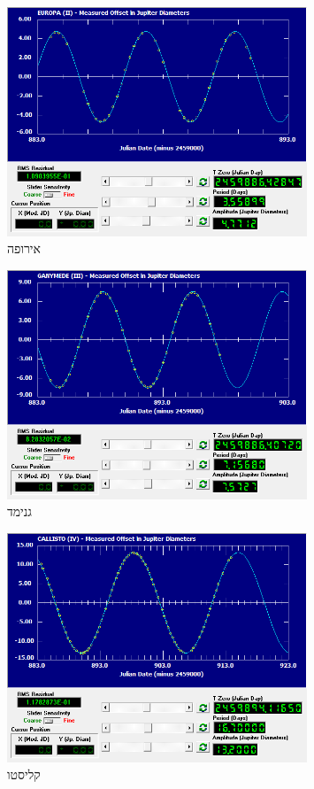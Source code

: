 \documentclass[a4paper, 12pt]{article}
\begin{document}
    \vfill

    \begin{figure}[h!]
        \centering
        \includegraphics[width=0.8\textwidth]{../assets/europa_graph.png}
        \caption{אירופה}
    \end{figure}

    \vfill

    \pagebreak %

    \begin{figure}[h!]
        \centering
        \includegraphics[width=0.8\textwidth]{../assets/ganymede_graph.png}
        \caption{גנימד}
    \end{figure}

    \vfill

    \begin{figure}[h!]
        \centering
        \includegraphics[width=0.8\textwidth]{../assets/callisto_graph.png}
        \caption{קליסטו}
    \end{figure}
\end{document}

